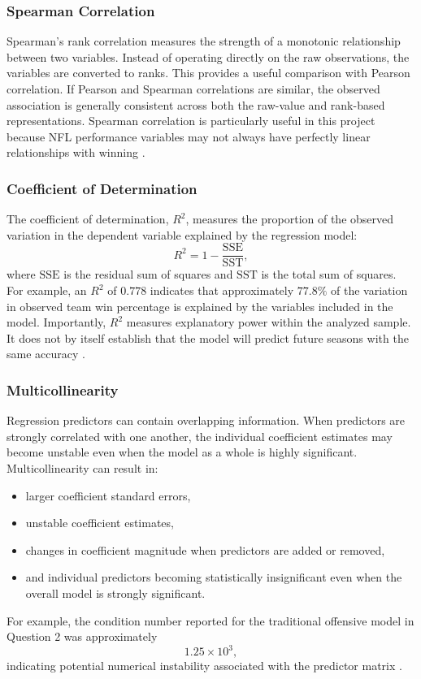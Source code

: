 \documentclass[11pt]{article}
\begin{document}
\subsubsection*{Spearman Correlation} 
Spearman's rank correlation measures the strength of a monotonic relationship between two variables. Instead of operating directly on the raw observations, the variables are converted to ranks. This provides a useful comparison with Pearson correlation. If Pearson and Spearman correlations are similar, the observed association is generally consistent across both the raw-value and rank-based representations. Spearman correlation is particularly useful in this project because NFL performance variables may not always have perfectly linear relationships with winning \cite{spearmancorr}.

\subsubsection*{Coefficient of Determination} 
The coefficient of determination, $R^2$, measures the proportion of the observed variation in the dependent variable explained by the regression model: \[ R^2 = 1- \frac{\mathrm{SSE}} {\mathrm{SST}}, \] where $\mathrm{SSE}$ is the residual sum of squares and $\mathrm{SST}$ is the total sum of squares. For example, an $R^2$ of $0.778$ indicates that approximately $77.8\%$ of the variation in observed team win percentage is explained by the variables included in the model. Importantly, $R^2$ measures explanatory power within the analyzed sample. It does not by itself establish that the model will predict future seasons with the same accuracy \cite{rsquared}.

\subsubsection*{Multicollinearity} 
Regression predictors can contain overlapping information. When predictors are strongly correlated with one another, the individual coefficient estimates may become unstable even when the model as a whole is highly significant. Multicollinearity can result in: \begin{itemize} \item larger coefficient standard errors, \item unstable coefficient estimates, \item changes in coefficient magnitude when predictors are added or removed, \item and individual predictors becoming statistically insignificant even when the overall model is strongly significant. \end{itemize} For example, the condition number reported for the traditional offensive model in Question 2 was approximately \[ 1.25\times10^3, \] indicating potential numerical instability associated with the predictor matrix \cite{multicollinearity}.
\end{document}
